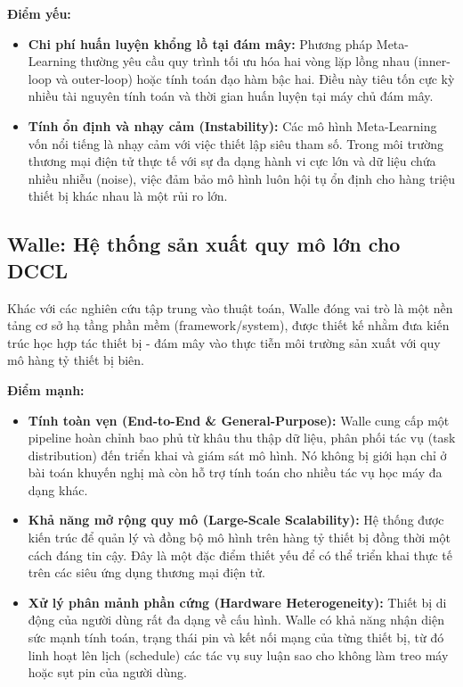 \textbf{Điểm yếu:}
\begin{itemize}
    \item \textbf{Chi phí huấn luyện khổng lồ tại đám mây:} Phương pháp Meta-Learning thường yêu cầu quy trình tối ưu hóa hai vòng lặp lồng nhau (inner-loop và outer-loop) hoặc tính toán đạo hàm bậc hai. Điều này tiêu tốn cực kỳ nhiều tài nguyên tính toán và thời gian huấn luyện tại máy chủ đám mây.
    \item \textbf{Tính ổn định và nhạy cảm (Instability):} Các mô hình Meta-Learning vốn nổi tiếng là nhạy cảm với việc thiết lập siêu tham số. Trong môi trường thương mại điện tử thực tế với sự đa dạng hành vi cực lớn và dữ liệu chứa nhiều nhiễu (noise), việc đảm bảo mô hình luôn hội tụ ổn định cho hàng triệu thiết bị khác nhau là một rủi ro lớn.
\end{itemize}

\subsection{Walle: Hệ thống sản xuất quy mô lớn cho DCCL \cite{cheng2022walle}}

Khác với các nghiên cứu tập trung vào thuật toán, Walle đóng vai trò là một nền tảng cơ sở hạ tầng phần mềm (framework/system), được thiết kế nhằm đưa kiến trúc học hợp tác thiết bị - đám mây vào thực tiễn môi trường sản xuất với quy mô hàng tỷ thiết bị biên.

\textbf{Điểm mạnh:}
\begin{itemize}
    \item \textbf{Tính toàn vẹn (End-to-End \& General-Purpose):} Walle cung cấp một pipeline hoàn chỉnh bao phủ từ khâu thu thập dữ liệu, phân phối tác vụ (task distribution) đến triển khai và giám sát mô hình. Nó không bị giới hạn chỉ ở bài toán khuyến nghị mà còn hỗ trợ tính toán cho nhiều tác vụ học máy đa dạng khác.
    \item \textbf{Khả năng mở rộng quy mô (Large-Scale Scalability):} Hệ thống được kiến trúc để quản lý và đồng bộ mô hình trên hàng tỷ thiết bị đồng thời một cách đáng tin cậy. Đây là một đặc điểm thiết yếu để có thể triển khai thực tế trên các siêu ứng dụng thương mại điện tử.
    \item \textbf{Xử lý phân mảnh phần cứng (Hardware Heterogeneity):} Thiết bị di động của người dùng rất đa dạng về cấu hình. Walle có khả năng nhận diện sức mạnh tính toán, trạng thái pin và kết nối mạng của từng thiết bị, từ đó linh hoạt lên lịch (schedule) các tác vụ suy luận sao cho không làm treo máy hoặc sụt pin của người dùng.
\end{itemize}


